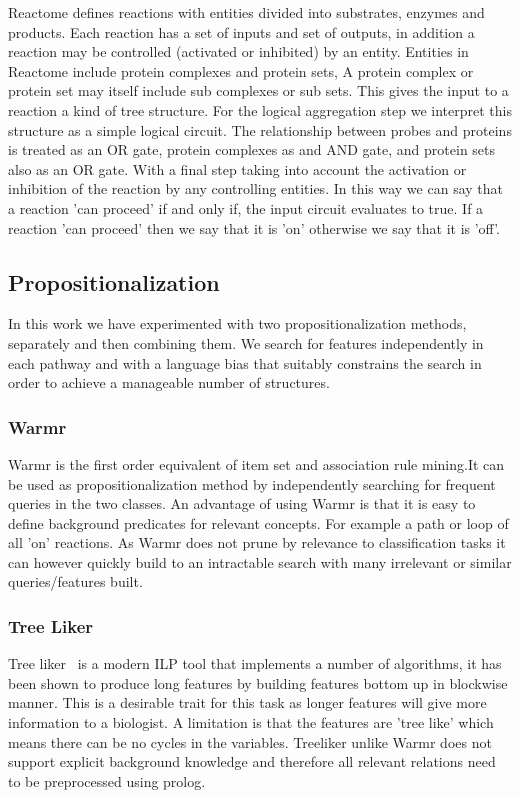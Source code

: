 \documentclass[runningheads,a4paper]{llncs}
\begin{document}
Reactome defines reactions with entities divided into substrates, enzymes and products. Each reaction has a set of inputs and set of outputs, in addition a reaction may be controlled (activated or inhibited) by an entity. Entities in Reactome include protein complexes and protein sets, A protein complex or protein set may itself include sub complexes or sub sets. This gives the input to a reaction a kind of tree structure. For the logical aggregation step we interpret this structure as a simple logical circuit. The relationship between probes and proteins is treated as an OR gate, protein complexes as and AND gate, and protein sets also as an OR gate. With a final step taking into account the activation or inhibition of the reaction by any controlling entities. In this way we can say that a reaction 'can proceed' if and only if, the input circuit evaluates to true. If a reaction 'can proceed' then we say that it is 'on' otherwise we say that it is 'off'. 

\subsection{Propositionalization}
In this work we have experimented with two propositionalization methods, separately and then combining them. We search for features independently in each pathway and with a language bias that suitably constrains the search in order to achieve a manageable number of structures. 
\subsubsection{Warmr}
Warmr \citep{dehaspe_mining_1997} is the first order equivalent of item set and association rule mining.It can be used as propositionalization method by independently searching for frequent queries in the two classes. An advantage of using Warmr is that it is easy to define background predicates for relevant concepts. For example a path or loop of all 'on' reactions. As Warmr does not prune by relevance to classification tasks it can however quickly build to an intractable search with many irrelevant or similar queries/features built. 
	     
\subsubsection{Tree Liker}
Tree liker~\citep{vzelezny2013fast} is a modern ILP tool that implements a number of algorithms, it has been shown to produce long features by building features bottom up in blockwise manner. This is a desirable trait for  this task as longer features will give more information to a biologist. A limitation is that the features are 'tree like' which means there can be no cycles in the variables. Treeliker unlike Warmr does not support explicit background knowledge and therefore all relevant relations need to be preprocessed using prolog.
\end{document}
